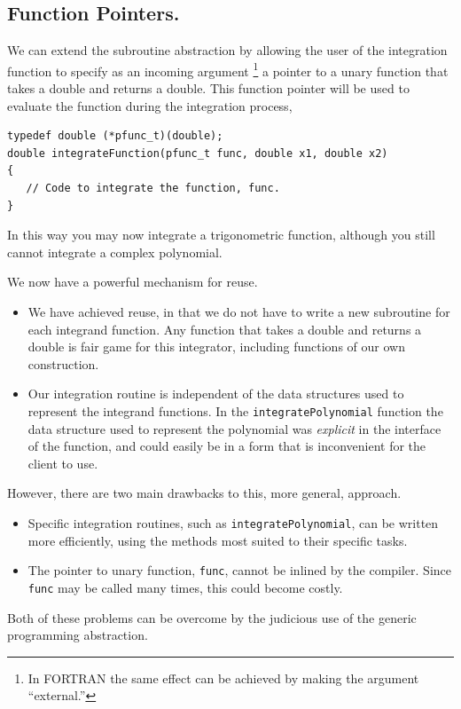 \documentclass[reqno]{lanl}
\begin{document}
\subsection{Function Pointers.}
We can extend the subroutine abstraction by allowing the user
of the integration function
to specify as an incoming argument%
\footnote{In FORTRAN the same effect can be achieved by making the
argument ``external.''}
a pointer to a unary function that takes a double and returns a double.
This function pointer will be used to evaluate the function during the
integration process,
%
 \begin{verbatim}
typedef double (*pfunc_t)(double);
double integrateFunction(pfunc_t func, double x1, double x2)
{
   // Code to integrate the function, func.
}
\end{verbatim} \normalcolor
%
In this way you may now integrate a trigonometric function, although
you still cannot integrate a complex polynomial.

We now have a powerful mechanism for reuse.
\begin{itemize}
\item We have achieved reuse, in that we
  do not have to write a new subroutine for each integrand function.
  Any function that takes a double and returns a double is fair game for
  this integrator, including functions of our own construction.
\item Our
  integration routine is independent of the data structures used to represent
  the integrand functions.
  In the \texttt{integratePolynomial} function the data structure used to
  represent the polynomial was \emph{explicit} in the interface of the function,
  and could easily be in a form that is inconvenient for the client to use.
\end{itemize}

However, there are two main drawbacks to this, more general, approach.
\begin{itemize}
\item Specific integration routines, such as \texttt{integratePolynomial},
  can be written more efficiently, using the methods most suited to
  their specific tasks.
\item The pointer to unary function, \texttt{func}, cannot be inlined by
  the compiler.  Since \texttt{func} may be called many times, this could
  become costly.
\end{itemize}
%
Both of these problems can be overcome by the judicious use
of the generic programming abstraction.
\end{document}
